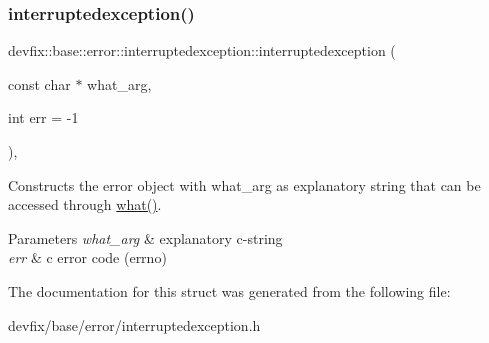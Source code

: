 \subsubsection{\texorpdfstring{interruptedexception()}{interruptedexception()}\hspace{0.1cm}{\footnotesize\ttfamily [2/2]}}
{\footnotesize\ttfamily devfix\+::base\+::error\+::interruptedexception\+::interruptedexception (\begin{DoxyParamCaption}\item[{const char $\ast$}]{what\+\_\+arg,  }\item[{int}]{err = {\ttfamily -\/1} }\end{DoxyParamCaption})\hspace{0.3cm}{\ttfamily [inline]}, {\ttfamily [explicit]}}

Constructs the error object with what\+\_\+arg as explanatory string that can be accessed through \hyperlink{structdevfix_1_1base_1_1error_1_1baseexception_a16327152a55d65b1e537825231fbd452}{what()}. 
\begin{DoxyParams}{Parameters}
{\em what\+\_\+arg} & explanatory c-\/string \\
\hline
{\em err} & c error code (errno) \\
\hline
\end{DoxyParams}


The documentation for this struct was generated from the following file\+:\begin{DoxyCompactItemize}
\item 
devfix/base/error/interruptedexception.\+h\end{DoxyCompactItemize}
